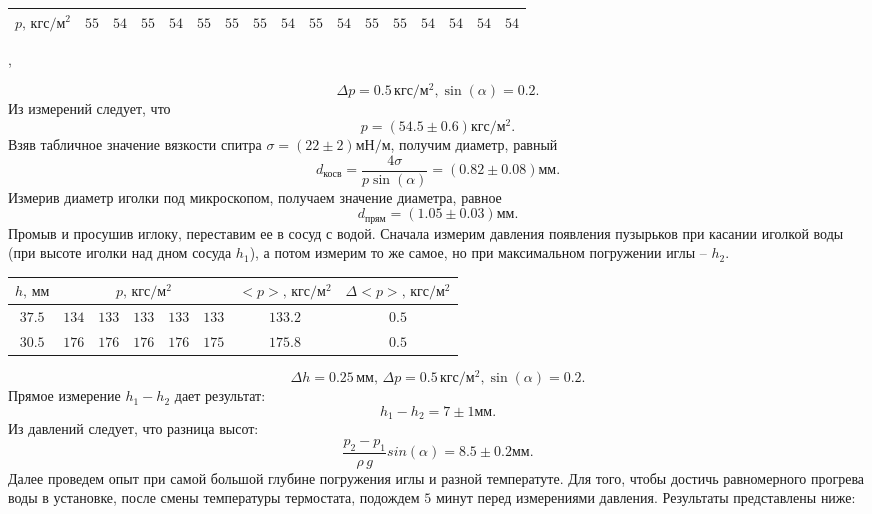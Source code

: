 \begin{center}
\begin{tabular}{|c|c|c|c|c|c|c|c|c|c|c|c|c|c|c|c|c|}
\hline
$p,\,\text{кгс}/\text{м}^2$&$55$&$54$&$55$&$54$&$55$&$55$&$55$&$54$&$55$&$54$&$55$&$55$&$54$&$54$&$54$&$54$\\
\hline
\end{tabular},
\end{center}
$$\Delta p = 0.5\,\text{кгс}/\text{м}^2, \sin(\alpha) = 0.2.$$
Из измерений следует, что
$$p = (54.5 \pm 0.6) \text{кгс}/\text{м}^2.$$
Взяв табличное значение вязкости спитра $\sigma = (22\pm2) \text{мН}/\text{м}$, получим диаметр, равный
$$d_\text{косв} = \frac{4\sigma}{p\sin(\alpha)} = (0.82\pm0.08) \text{мм}.$$
Измерив диаметр иголки под микроскопом, получаем значение диаметра, равное
$$d_\text{прям} = (1.05\pm0.03) \text{мм}.$$
Промыв и просушив иглоку, переставим ее в сосуд с водой. Сначала измерим давления появления пузырьков при касании иголкой воды (при высоте иголки над дном сосуда $h_1$), а потом измерим то же самое, но при максимальном погружении иглы -- $h_2$.
\begin{center}
	\begin{tabular}{|c|c|c|c|c|c|c|c|}
	\hline
	$h,\,\text{мм}$ & \multicolumn{5}{c|}{$p,\,\text{кгс}/\text{м}^2$} & $<p>,\,\text{кгс}/\text{м}^2$ & $\Delta<p>,\,\text{кгс}/\text{м}^2$\\
	\hline
	$37.5$&$134$&$133$&$133$&$133$&$133$&$133.2$&$0.5$\\
	\hline
	$30.5$&$176$&$176$&$176$&$176$&$175$&$175.8$&$0.5$\\
	\hline
	\end{tabular}
\end{center}
$$\Delta h = 0.25\,\text{мм},\,\Delta p = 0.5\,\text{кгс}/\text{м}^2, \sin(\alpha) = 0.2.$$
Прямое измерение $h_1 - h_2$ дает результат:
$$h_1 - h_2 = 7 \pm 1 \text{мм}.$$
Из давлений следует, что разница высот:
$$\frac{p_2 - p_1}{\rho\,g}sin(\alpha)=8.5\pm0.2\text{мм}.$$
Далее проведем опыт при самой большой глубине погружения иглы и разной температуте. Для того, чтобы достичь равномерного прогрева воды в установке, после смены температуры термостата, подождем $5$ минут перед измерениями давления.
Результаты представлены ниже:
